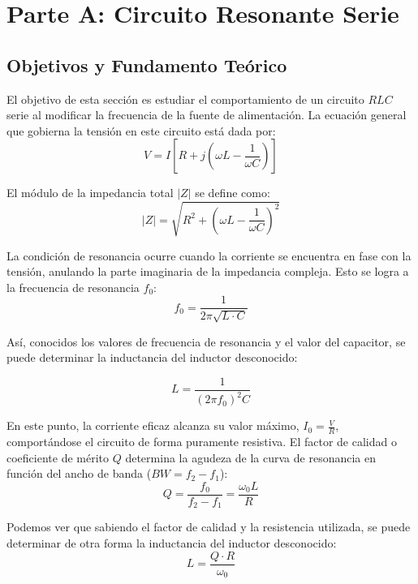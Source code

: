 \section{Parte A: Circuito Resonante Serie}

\subsection{Objetivos y Fundamento Teórico}
El objetivo de esta sección es estudiar el comportamiento de un circuito $RLC$ serie al modificar la frecuencia de la fuente de alimentación. La ecuación general que gobierna la tensión en este circuito está dada por:
\begin{equation}
V = I \left[ R + j\left(\omega L - \frac{1}{\omega C}\right) \right]
\end{equation}

El módulo de la impedancia total $|Z|$ se define como:
\begin{equation}
|Z| = \sqrt{R^2 + \left(\omega L - \frac{1}{\omega C}\right)^2}
\end{equation}

La condición de resonancia ocurre cuando la corriente se encuentra en fase con la tensión, anulando la parte imaginaria de la impedancia compleja. Esto se logra a la frecuencia de resonancia $f_0$:
\begin{equation}
f_0 = \frac{1}{2\pi\sqrt{L \cdot C}}
\end{equation}

Así, conocidos los valores de frecuencia de resonancia y el valor del capacitor, se puede determinar la inductancia del inductor desconocido:

\begin{equation}
L = \frac{1}{(2\pi f_0)^2 C}
\label{calculo_l_1}
\end{equation}

En este punto, la corriente eficaz alcanza su valor máximo, $I_0 = \frac{V}{R}$, comportándose el circuito de forma puramente resistiva. El factor de calidad o coeficiente de mérito $Q$ determina la agudeza de la curva de resonancia en función del ancho de banda ($BW = f_2 - f_1$):
\begin{equation}
Q = \frac{f_0}{f_2 - f_1} = \frac{\omega_0 L}{R}
\label{calculo_q}
\end{equation}

Podemos ver que sabiendo el factor de calidad y la resistencia utilizada, se puede determinar de otra forma la inductancia del inductor desconocido:
\begin{equation}
L = \frac{Q \cdot R}{\omega_0}
\end{equation}

